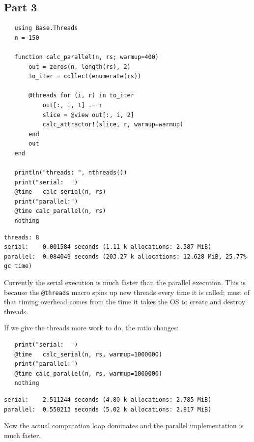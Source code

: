 \documentclass[nobib]{tufte-handout}
\begin{document}
\subsection{Part 3}
\label{sec:org165a893}
\begin{verbatim}
   using Base.Threads
   n = 150

   function calc_parallel(n, rs; warmup=400)
       out = zeros(n, length(rs), 2)
       to_iter = collect(enumerate(rs))

       @threads for (i, r) in to_iter
           out[:, i, 1] .= r
           slice = @view out[:, i, 2]
           calc_attractor!(slice, r, warmup=warmup)
       end
       out
   end

   println("threads: ", nthreads())
   print("serial:  ")
   @time   calc_serial(n, rs)
   print("parallel:")
   @time calc_parallel(n, rs)
   nothing
\end{verbatim}

\begin{verbatim}
threads: 8
serial:    0.001584 seconds (1.11 k allocations: 2.587 MiB)
parallel:  0.084049 seconds (203.27 k allocations: 12.628 MiB, 25.77% gc time)
\end{verbatim}


Currently the serial execution is much faster than the parallel execution. This is because the \texttt{@threads} macro spins up new threads
every time it is called; most of that timing overhead comes from the time it takes the OS to create and destroy threads.

If we give the threads more work to do, the ratio changes:

\begin{verbatim}
   print("serial:  ")
   @time   calc_serial(n, rs, warmup=1000000)
   print("parallel:")
   @time calc_parallel(n, rs, warmup=1000000)
   nothing
\end{verbatim}

\begin{verbatim}
serial:    2.511244 seconds (4.80 k allocations: 2.785 MiB)
parallel:  0.550213 seconds (5.02 k allocations: 2.817 MiB)
\end{verbatim}


Now the actual computation loop dominates and the parallel implementation is much faster.
\end{document}
